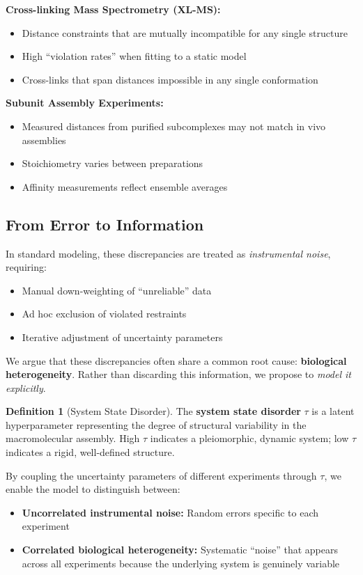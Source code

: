 \documentclass[11pt,a4paper]{article}
\theoremstyle{definition}
\newtheorem{definition}{Definition}
\begin{document}
\textbf{Cross-linking Mass Spectrometry (XL-MS):}
\begin{itemize}
    \item Distance constraints that are mutually incompatible for any single structure
    \item High ``violation rates'' when fitting to a static model
    \item Cross-links that span distances impossible in any single conformation
\end{itemize}

\textbf{Subunit Assembly Experiments:}
\begin{itemize}
    \item Measured distances from purified subcomplexes may not match in vivo assemblies
    \item Stoichiometry varies between preparations
    \item Affinity measurements reflect ensemble averages
\end{itemize}

\subsection{From Error to Information}

In standard modeling, these discrepancies are treated as \textit{instrumental noise}, requiring:
\begin{itemize}
    \item Manual down-weighting of ``unreliable'' data
    \item Ad hoc exclusion of violated restraints
    \item Iterative adjustment of uncertainty parameters
\end{itemize}

We argue that these discrepancies often share a common root cause: \textbf{biological heterogeneity}. Rather than discarding this information, we propose to \textit{model it explicitly}.

\begin{definition}[System State Disorder]
The \textbf{system state disorder} $\tau$ is a latent hyperparameter representing the degree of structural variability in the macromolecular assembly. High $\tau$ indicates a pleiomorphic, dynamic system; low $\tau$ indicates a rigid, well-defined structure.
\end{definition}

By coupling the uncertainty parameters of different experiments through $\tau$, we enable the model to distinguish between:
\begin{itemize}
    \item \textbf{Uncorrelated instrumental noise:} Random errors specific to each experiment
    \item \textbf{Correlated biological heterogeneity:} Systematic ``noise'' that appears across all experiments because the underlying system is genuinely variable
\end{itemize}
\end{document}
